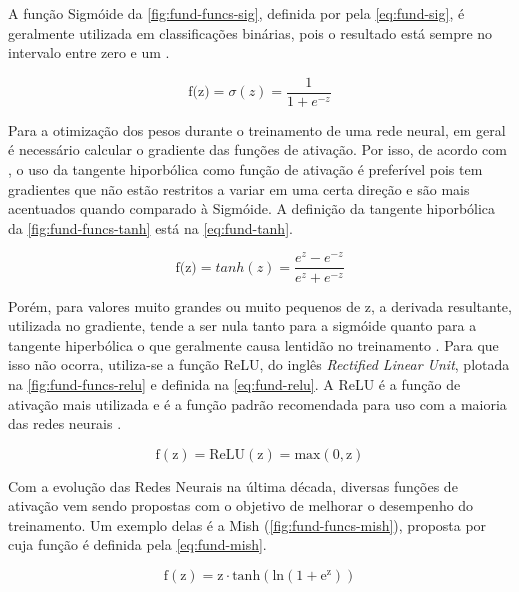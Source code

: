 A função Sigmóide da \autoref{fig:fund-funcs-sig}, definida por  pela \autoref{eq:fund-sig}, é geralmente utilizada em classificações binárias, pois o resultado está sempre no intervalo entre zero e um \cite{ref:Ng}.

\begin{equation} \label{eq:fund-sig}
  \text{f(z)} = \sigma(z) = \frac{1}{1 + e^{-z}}
\end{equation}

Para a otimização dos pesos durante o treinamento de uma rede neural, em geral é necessário calcular o gradiente das funções de ativação. Por isso, de acordo com , o uso da tangente hiporbólica como função de ativação é preferível pois tem gradientes que não estão restritos a variar em uma certa direção e são mais acentuados quando comparado à Sigmóide. A definição da tangente hiporbólica da \autoref{fig:fund-funcs-tanh} está na \autoref{eq:fund-tanh}.

\begin{equation} \label{eq:fund-tanh}
  \text{f(z)} = tanh(z) = \frac{e^{z} - e^{-z}}{e^{z} + e^{-z}}
\end{equation}

Porém, para valores muito grandes ou muito pequenos de $\mathrm{z}$, a derivada resultante, utilizada no gradiente, tende a ser nula tanto para a sigmóide quanto para a tangente hiperbólica \cite{ref:Ng} o que geralmente causa lentidão no treinamento \cite{ref:Misra}. Para que isso não ocorra, utiliza-se a função ReLU, do inglês \textit{Rectified Linear Unit}, plotada na \autoref{fig:fund-funcs-relu} e definida na \autoref{eq:fund-relu}. A ReLU é a função de ativação mais utilizada \cite{ref:Ng} e é a função padrão recomendada para uso com a maioria das redes neurais \cite{ref:Goodfellow-Bengio-Courville}.

\begin{equation} \label{eq:fund-relu}
  \mathrm{{f(z)} = ReLU(z) = max(0, z)}
\end{equation}

Com a evolução das Redes Neurais na última década, diversas funções de ativação vem sendo propostas com o objetivo de melhorar o desempenho do treinamento. Um exemplo delas é a Mish (\autoref{fig:fund-funcs-mish}), proposta por  cuja função é definida pela \autoref{eq:fund-mish}.

\begin{equation} \label{eq:fund-mish}
  \mathrm{{f(z)} = z \cdot tanh(ln(1 + e^z))}
\end{equation}

